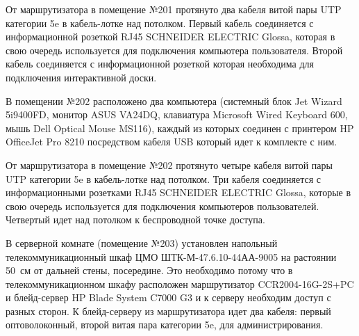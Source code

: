 От маршрутизатора в помещение №201 протянуто два кабеля витой пары UTP категории 5e в кабель-лотке над потолком. Первый кабель соединяется с информационной розеткой RJ45 SCHNEIDER ELECTRIC Glossa, которая в свою очередь используется для подключения компьютера пользователя. Второй кабель соединяется с информационной розеткой которая необходима для подключения интерактивной доски.

В помещении №202 расположено два компьютера (системный блок Jet Wizard 5i9400FD, монитор ASUS VA24DQ, клавиатура Microsoft Wired Keyboard 600, мышь Dell Optical Mouse MS116), каждый из которых соединен с принтером HP OfficeJet Pro 8210 посредством кабеля USB который идет к комплекте с ним. 

От маршрутизатора в помещение №202 протянуто четыре кабеля витой пары UTP категории 5e в кабель-лотке над потолком. Три кабеля соединяется с информационными розетками RJ45 SCHNEIDER ELECTRIC Glossa, которые в свою очередь используется для подключения компьютеров пользователей. Четвертый идет над потолком к беспроводной точке доступа.

В серверной комнате (помещение №203) установлен напольный телекоммуникационный шкаф ЦМО ШТК-М-47.6.10-44АА-9005 на растоянии 50~см от дальней стены, посередине. Это необходимо потому что в телекоммуникационном шкафу расположен маршрутизатор CCR2004-16G-2S+PC и блейд-сервер HP Blade System C7000 G3 и к серверу необходим доступ с разных сторон. К блейд-серверу из маршрутизатора идет два кабеля: первый оптоволоконный, второй витая пара категории 5e, для администрирования.